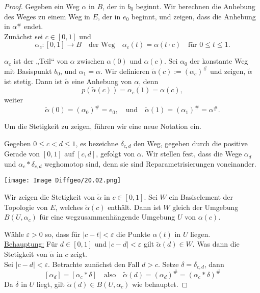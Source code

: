 \documentclass[fleqn, 12pt, letterpaper]{article}
\begin{document}
\begin{proof}
Gegeben ein Weg \( \alpha \) in \( B \), der in \( b_0 \) beginnt.  
Wir berechnen die Anhebung des Weges zu einem Weg in \( E \), der in \( e_0 \) beginnt,  
und zeigen, dass die Anhebung in \( \alpha^\# \) endet.\\

{Zunächst} sei \( c \in [0,1] \) und  
\[
\alpha_c \colon [0,1] \to B \quad \text{der Weg} \quad \alpha_c(t) = \alpha(t \cdot c) \quad \text{für } 0 \leq t \leq 1.
\]

\(\alpha_c\) ist der „Teil“ von \(\alpha\) zwischen \(\alpha(0)\) und \(\alpha(c)\).  
Sei \(\alpha_0\) der konstante Weg mit Basispunkt \( b_0 \), und \(\alpha_1 = \alpha\). Wir definieren \(\widetilde{\alpha}(c) := (\alpha_c)^\#\) und zeigen, \(\widetilde{\alpha}\) ist stetig. Dann ist \(\widetilde{\alpha}\) eine Anhebung von \(\alpha\), denn  
\[
p(\widetilde{\alpha}(c)) = \alpha_c(1) = \alpha(c),
\]
weiter
\[
\widetilde{\alpha}(0) = (\alpha_0)^\# = e_0, \quad \text{und} \quad \widetilde{\alpha}(1) = (\alpha_1)^\# = \alpha^\#.
\]

Um die Stetigkeit zu zeigen, führen wir eine neue Notation ein.

Gegeben \( 0 \le c < d \le 1 \), es bezeichne \( \delta_{c,d} \) den Weg, gegeben durch die positive Gerade von \([0,1]\) auf \([c,d]\), gefolgt von \( \alpha \). Wir stellen fest, dass die Wege \( \alpha_d \) und \( \alpha_c*\delta_{c,d} \) weghomotop sind, denn sie sind Reparametrisierungen voneinander.

\begin{center}
\texttt{[image: Image Diffgeo/20.02.png]}
\end{center}

Wir zeigen die Stetigkeit von \( \tilde{\alpha} \) in \( c \in [0,1] \). Sei \( W \) ein Basiselement der Topologie von \( E \), welches \( \tilde{\alpha}(c) \) enthält. Dann ist \( W \) gleich der Umgebung \( B(U, \alpha_c) \) für eine wegzusammenhängende Umgebung \( U \) von \( \alpha(c) \).

Wähle \( \varepsilon > 0 \) so, dass für \( |c - t| < \varepsilon \) die Punkte \( \alpha(t) \) in \( U \) liegen.\\

\underline{Behauptung:} Für \( d \in [0,1] \) und \( |c - d| < \varepsilon \) gilt \( \tilde{\alpha}(d) \in W \). Was dann die Stetigkeit von \( \tilde{\alpha} \) in \( c \) zeigt.\\

Sei \( |c - d| < \varepsilon \). Betrachte zunächst den Fall \( d > c \). Setze \( \delta = \delta_{c,d} \), dann
\[
[\alpha_d] = [\alpha_c * \delta] \quad \text{also} \quad \widetilde{\alpha}(d) = \left( \alpha_d \right)^\# = \left( \alpha_c \ast \delta \right)^\#
\]
Da \( \delta \) in \( U \) liegt, gilt \( \tilde{\alpha}(d) \in B(U, \alpha_c) \) wie behauptet.


\end{proof}
\end{document}

